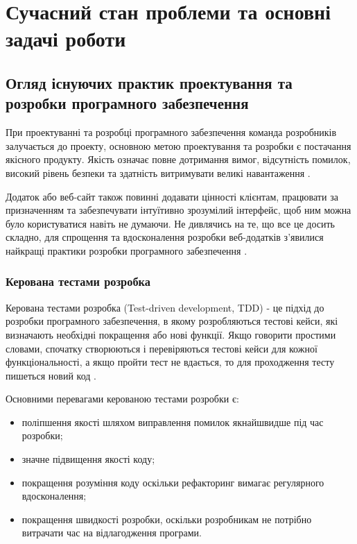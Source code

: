 \section{Сучасний стан проблеми та основні задачі роботи}

\subsection{Огляд існуючих практик проектування та розробки програмного забезпечення}

При проектуванні та розробці програмного забезпечення команда
розробників залучається до проекту, основною метою проектування
та розробки є постачання якісного продукту.
Якість означає повне дотримання вимог, відсутність помилок,
високий рівень безпеки та здатність витримувати великі навантаження 
\cite{tdd-bdd-article}.

Додаток або веб-сайт також повинні додавати цінності клієнтам,
працювати за призначенням та забезпечувати інтуїтивно зрозумілий інтерфейс,
щоб ним можна було користуватися навіть не думаючи. Не дивлячись на те,
що все це досить складно, для спрощення та вдосконалення розробки веб-додатків з’явилися
найкращі практики розробки програмного забезпечення \cite{business-rybakov}.

\subsubsection{Керована тестами розробка}

Керована тестами розробка (Test-driven development, TDD) 
- це підхід до розробки програмного забезпечення,
в якому розробляються тестові кейси, які визначають необхідні покращення або нові функції.
Якщо говорити простими словами, спочатку створюються і перевіряються тестові кейси
для кожної функціональності, а якщо пройти тест не вдається,
то для проходження тесту пишеться новий код \cite{tdd-article}.

Основними перевагами керованою тестами розробки є:

\begin{itemize}
    \item поліпшення якості шляхом виправлення помилок якнайшвидше під час розробки;
		\item значне підвищення якості коду;
		\item покращення розуміння коду оскільки рефакторинг
			вимагає регулярного вдосконалення;
		\item покращення швидкості розробки, оскільки розробникам
			не потрібно витрачати час на відлагодження програми.
\end{itemize}

